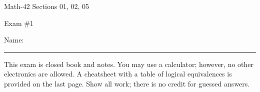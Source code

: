 \documentclass[letterpaper,12pt,fleqn]{article}
\begin{document}
\begin{center}
  \large
  Math-42 Sections 01, 02, 05

  \Large
  Exam \#1
\end{center}

\vspace{0.5in}

Name: \rule{4in}{1pt}

\vspace{0.5in}

This exam is closed book and notes. You may use a calculator; however, no other electronics are allowed.  A
cheatsheet with a table of logical equivalences is provided on the last page.  Show all work; there is no credit
for guessed answers.

\vspace{0.5in}
\end{document}
